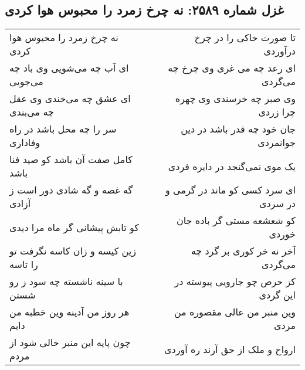 \begin{center}
\section*{غزل شماره ۲۵۸۹: نه چرخ زمرد را محبوس هوا کردی}
\label{sec:2589}
\begin{longtable}{l p{0.5cm} r}
نه چرخ زمرد را محبوس هوا کردی
&&
تا صورت خاکی را در چرخ درآوردی
\\
ای آب چه می‌شویی وی باد چه می‌جویی
&&
ای رعد چه می غری وی چرخ چه می‌گردی
\\
ای عشق چه می‌خندی وی عقل چه می‌بندی
&&
وی صبر چه خرسندی وی چهره چرا زردی
\\
سر را چه محل باشد در راه وفاداری
&&
جان خود چه قدر باشد در دین جوانمردی
\\
کامل صفت آن باشد کو صید فنا باشد
&&
یک موی نمی‌گنجد در دایره فردی
\\
گه غصه و گه شادی دور است ز آزادی
&&
ای سرد کسی کو ماند در گرمی و در سردی
\\
کو تابش پیشانی گر ماه مرا دیدی
&&
کو شعشعه مستی گر باده جان خوردی
\\
زین کیسه و زان کاسه نگرفت تو را تاسه
&&
آخر نه خر کوری بر گرد چه می‌گردی
\\
با سینه ناشسته چه سود ز رو شستن
&&
کز حرص چو جارویی پیوسته در این گردی
\\
هر روز من آدینه وین خطبه من دایم
&&
وین منبر من عالی مقصوره من مردی
\\
چون پایه این منبر خالی شود از مردم
&&
ارواح و ملک از حق آرند ره آوردی
\\
\end{longtable}
\end{center}

